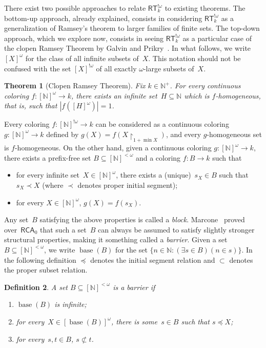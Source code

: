 \documentclass[10pt,a4paper]{article}
\newcommand{\uh}{\upharpoonright}
\newcommand{\RCA}[0]{\mathsf{RCA}}
\newcommand{\RT}[0]{\mathsf{RT}}
\newcommand{\NN}[0]{\mathbb{N}}
\newcommand{\base}{\operatorname{base}}
\newtheorem{theorem}{Theorem}
\numberwithin{theorem}{section}
\newtheorem{definition}[theorem]{Definition}
\begin{document}
There exist two possible approaches to relate $\RT^{!\omega}_k$ to existing theorems. The bottom-up approach, already explained, consists in considering $\RT^{!\omega}_k$ as a generalization of Ramsey's theorem to larger families of finite sets. The top-down approach, which we explore now, consists in seeing $\RT^{!\omega}_k$ as a particular case of the clopen Ramsey Theorem by Galvin and Prikry~\cite{galvinBorelSetsRamsey1973}. In what follows, we write $[X]^\omega$ for the class of all infinite subsets of~$X$. This notation should not be confused with the set $[X]^{!\omega}$ of all exactly $\omega$-large subsets of~$X$.

\begin{theorem}[Clopen Ramsey Theorem]
Fix $k \in \NN^+$.
For every continuous coloring $f : [\NN]^\omega \to k$, there exists an infinite set~$H \subseteq \NN$
which is \emph{$f$-homogeneous}, that is, such that $|f([H]^\omega)| = 1$.
\end{theorem}

Every coloring $f : [\NN]^{!\omega} \to k$ can be considered as a continuous coloring $g : [\NN]^\omega \to k$
defined by $g(X) = f(X \uh_{1+\min X})$, and every $g$-homogeneous set is $f$-homogeneous.
On the other hand, given a continuous coloring $g : [\NN]^\omega \to k$, there exists a prefix-free set $B \subseteq [\NN]^{<\omega}$ and a coloring $f : B \to k$ such that 
\begin{itemize}
    \item[(1)] for every infinite set~$X \in [\NN]^\omega$, there exists a (unique)~$s_X \in B$ such that $s_X \prec X$ (where $\prec$ denotes proper initial segment);
    \item[(2)] for every $X \in [\NN]^\omega$, $g(X) = f(s_X)$.
\end{itemize}
Any set~$B$ satisfying the above properties is called a \emph{block}.
Marcone~\cite{marcone2005wqo} proved over~$\RCA_0$ that such a set~$B$ can always be assumed to satisfy slightly stronger structural properties, making it something called a \emph{barrier}. Given a set~$B \subseteq [\NN]^{<\omega}$, we write $\base(B)$ for the set $\{ n \in \NN : (\exists s \in B)(n \in s) \}$. In the following definition $\preceq$ denotes the initial segment relation and $\subset$ denotes the proper subset relation.

\begin{definition}
A set $B \subseteq [\NN]^{<\omega}$ is a \emph{barrier} if
\begin{enumerate}
    \item[(1)] $\base(B)$ is infinite;
    \item[(2)] for every~$X \in [\base(B)]^\omega$, there is some~$s \in B$ such that $s \preceq X$;
    \item[(3)] for every~$s, t \in B$, $s \not \subset t$.
\end{enumerate}
\end{definition}
\end{document}
